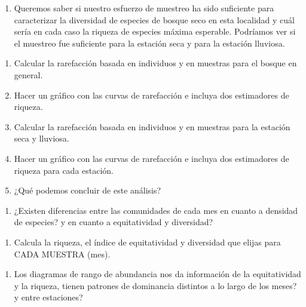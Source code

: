 \documentclass[]{book}
\providecommand{\tightlist}{%
  \setlength{\itemsep}{0pt}\setlength{\parskip}{0pt}}
\begin{document}
\begin{enumerate}
\def\labelenumi{\arabic{enumi}.}
\setcounter{enumi}{2}
\tightlist
\item
  Queremos saber si nuestro esfuerzo de muestreo ha sido suficiente para
  caracterizar la diversidad de especies de bosque seco en esta
  localidad y cuál sería en cada caso la riqueza de especies máxima
  esperable. Podríamos ver si el muestreo fue suficiente para la
  estación seca y para la estación lluviosa.
\end{enumerate}

\begin{enumerate}
\def\labelenumi{\alph{enumi}.}
\tightlist
\item
  Calcular la rarefacción basada en individuos y en muestras para el
  bosque en general.
\item
  Hacer un gráfico con las curvas de rarefacción e incluya dos
  estimadores de riqueza.
\item
  Calcular la rarefacción basada en individuos y en muestras para la
  estación seca y lluviosa.
\item
  Hacer un gráfico con las curvas de rarefacción e incluya dos
  estimadores de riqueza para cada estación.
\item
  ¿Qué podemos concluir de este análisis?
\end{enumerate}

\begin{enumerate}
\def\labelenumi{\arabic{enumi}.}
\setcounter{enumi}{3}
\tightlist
\item
  ¿Existen diferencias entre las comunidades de cada mes en cuanto a
  densidad de especies? y en cuanto a equitatividad y diversidad?
\end{enumerate}

\begin{enumerate}
\def\labelenumi{\alph{enumi}.}
\tightlist
\item
  Calcula la riqueza, el índice de equitatividad y diversidad que elijas
  para CADA MUESTRA (mes).
\end{enumerate}

\begin{enumerate}
\def\labelenumi{\arabic{enumi}.}
\setcounter{enumi}{4}
\tightlist
\item
  Los diagramas de rango de abundancia nos da información de la
  equitatividad y la riqueza, tienen patrones de dominancia distintos a
  lo largo de los meses? y entre estaciones?
\end{enumerate}
\end{document}
